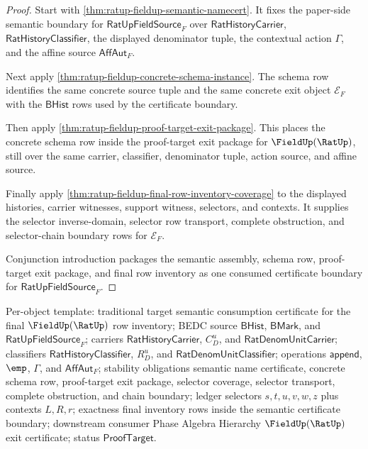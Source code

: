 \begin{proof}
Start with \autoref{thm:ratup-fieldup-semantic-namecert}. It fixes the
paper-side semantic boundary for $\mathsf{RatUpFieldSource}_F$ over
$\mathsf{RatHistoryCarrier}$, $\mathsf{RatHistoryClassifier}$, the displayed
denominator tuple, the contextual action $\Gamma$, and the affine source
$\mathsf{AffAut}_F$.

Next apply \autoref{thm:ratup-fieldup-concrete-schema-instance}. The schema
row identifies the same concrete source tuple and the same concrete exit object
$\mathcal E_F$ with the $\mathsf{BHist}$ rows used by the certificate boundary.

Then apply \autoref{thm:ratup-fieldup-proof-target-exit-package}. This places
the concrete schema row inside the proof-target exit package for
$\FieldUp(\RatUp)$, still over the same carrier, classifier, denominator
tuple, action source, and affine source.

Finally apply \autoref{thm:ratup-fieldup-final-row-inventory-coverage} to the
displayed histories, carrier witnesses, support witness, selectors, and
contexts. It supplies the selector inverse-domain, selector row transport,
complete obstruction, and selector-chain boundary rows for $\mathcal E_F$.

Conjunction introduction packages the semantic assembly, schema row,
proof-target exit package, and final row inventory as one consumed certificate
boundary for $\mathsf{RatUpFieldSource}_F$.
\end{proof}

Per-object template: traditional target semantic consumption certificate for
the final $\FieldUp(\RatUp)$ row inventory; BEDC source $\mathsf{BHist}$,
$\mathsf{BMark}$, and $\mathsf{RatUpFieldSource}_F$; carriers
$\mathsf{RatHistoryCarrier}$, $C_D^u$, and
$\mathsf{RatDenomUnitCarrier}$; classifiers $\mathsf{RatHistoryClassifier}$,
$R_D^u$, and $\mathsf{RatDenomUnitClassifier}$; operations $\mathsf{append}$,
$\emp$, $\Gamma$, and $\mathsf{AffAut}_F$; stability obligations semantic
name certificate, concrete schema row, proof-target exit package, selector
coverage, selector transport, complete obstruction, and chain boundary; ledger
selectors $s,t,u,v,w,z$ plus contexts $L,R,r$; exactness final inventory rows
inside the semantic certificate boundary; downstream consumer Phase Algebra
Hierarchy $\FieldUp(\RatUp)$ exit certificate; status $\mathsf{ProofTarget}$.

